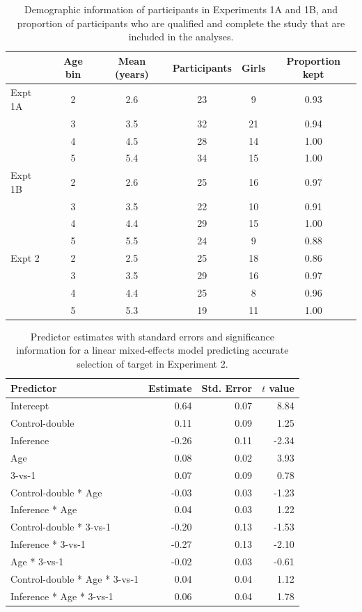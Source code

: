 \documentclass{rsos}
\begin{document}
\vspace*{-10pt}

\begin{table}[!h]
\centering
\begin{tabular}{lccccc}
  & Age bin & Mean (years) & Participants & Girls & Proportion kept \\ 
  \hline
Expt 1A & 2 & 2.6 & 23 & 9 & 0.93 \\ 
    & 3 & 3.5 & 32 & 21 & 0.94 \\ 
    & 4 & 4.5 & 28 & 14 & 1.00 \\ 
    & 5 & 5.4 & 34 & 15 & 1.00 \\ 
  Expt 1B & 2 & 2.6 & 25 & 16 & 0.97 \\ 
    & 3 & 3.5 & 22 & 10 & 0.91 \\ 
    & 4 & 4.4 & 29 & 15 & 1.00 \\ 
    & 5 & 5.5 & 24 & 9 & 0.88 \\ 
  Expt 2 & 2 & 2.5 & 25 & 18 & 0.86 \\ 
    & 3 & 3.5 & 29 & 16 & 0.97 \\ 
    & 4 & 4.4 & 25 & 8 & 0.96 \\ 
    & 5 & 5.3 & 19 & 11 & 1.00 \\ 
   \hline
\end{tabular}
\caption{Demographic information of participants in Experiments 1A and 1B, and proportion of participants who are qualified and complete the study that are included in the analyses.} 
\label{tab:exp1_summary}
\end{table}

\begin{table}[!h]
\centering
\begin{tabular}{lrrr}
 Predictor & Estimate & Std. Error & $t$ value \\ 
  \hline
Intercept & 0.64 & 0.07 & 8.84 \\ 
  Control-double & 0.11 & 0.09 & 1.25 \\ 
  Inference & -0.26 & 0.11 & -2.34 \\ 
  Age & 0.08 & 0.02 & 3.93 \\ 
  3-vs-1 & 0.07 & 0.09 & 0.78 \\ 
  Control-double * Age & -0.03 & 0.03 & -1.23 \\ 
  Inference * Age & 0.04 & 0.03 & 1.22 \\ 
  Control-double * 3-vs-1 & -0.20 & 0.13 & -1.53 \\ 
  Inference * 3-vs-1 & -0.27 & 0.13 & -2.10 \\ 
  Age * 3-vs-1 & -0.02 & 0.03 & -0.61 \\ 
  Control-double * Age * 3-vs-1 & 0.04 & 0.04 & 1.12 \\ 
  Inference * Age * 3-vs-1 & 0.06 & 0.04 & 1.78 \\ 
   \hline
\end{tabular}
\caption{Predictor estimates with standard errors and significance information for a linear mixed-effects model predicting accurate selection of target in Experiment 2.} 
\label{tab:exp3_tab}
\end{table}
\end{document}
